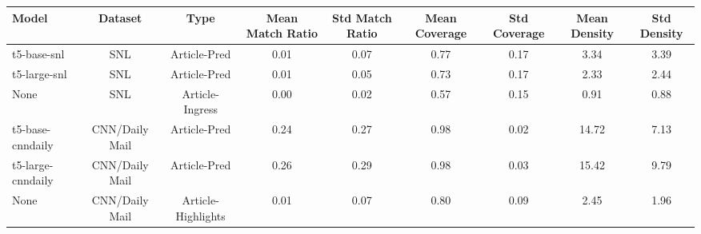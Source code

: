 \begin{tabular}{lcccccccc}
\toprule
Model & Dataset & Type & Mean Match Ratio & Std Match Ratio & Mean Coverage & Std Coverage & Mean Density & Std Density \\
\midrule
t5-base-snl & SNL & Article-Pred & 0.01 & 0.07 & 0.77 & 0.17 & 3.34 & 3.39 \\
t5-large-snl & SNL & Article-Pred & 0.01 & 0.05 & 0.73 & 0.17 & 2.33 & 2.44 \\
None & SNL & Article-Ingress & 0.00 & 0.02 & 0.57 & 0.15 & 0.91 & 0.88 \\
t5-base-cnndaily & CNN/Daily Mail & Article-Pred & 0.24 & 0.27 & 0.98 & 0.02 & 14.72 & 7.13 \\
t5-large-cnndaily & CNN/Daily Mail & Article-Pred & 0.26 & 0.29 & 0.98 & 0.03 & 15.42 & 9.79 \\
None & CNN/Daily Mail & Article-Highlights & 0.01 & 0.07 & 0.80 & 0.09 & 2.45 & 1.96 \\
\bottomrule
\end{tabular}
